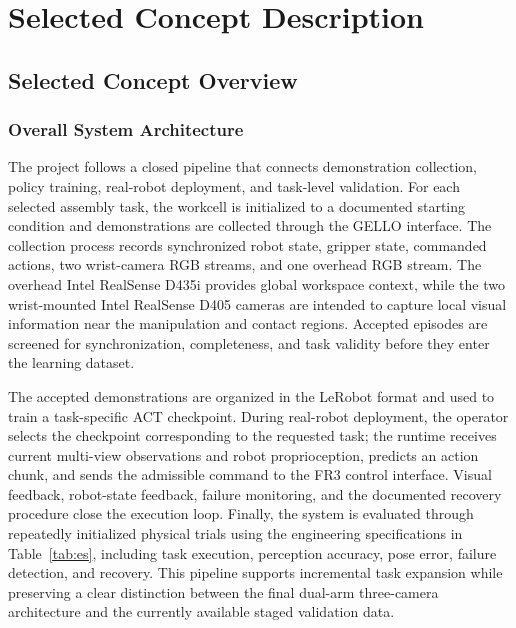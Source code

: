 \documentclass[12pt, letterpaper]{article}
\begin{document}
\section{Selected Concept Description}

\subsection{Selected Concept Overview}

\subsubsection{Overall System Architecture}

The project follows a closed pipeline that connects demonstration collection, policy training, real-robot deployment,
  and task-level validation. For each selected assembly task, the workcell is initialized to a documented starting
  condition and demonstrations are collected through the GELLO interface. The collection process records synchronized
  robot state, gripper state, commanded actions, two wrist-camera RGB streams, and one overhead RGB stream. The overhead
  Intel RealSense D435i provides global workspace context, while the two wrist-mounted Intel RealSense D405 cameras are
  intended to capture local visual information near the manipulation and contact regions. Accepted episodes are screened
  for synchronization, completeness, and task validity before they enter the learning dataset.

  The accepted demonstrations are organized in the LeRobot format and used to train a task-specific ACT checkpoint.
  During real-robot deployment, the operator selects the checkpoint corresponding to the requested task; the runtime
  receives current multi-view observations and robot proprioception, predicts an action chunk, and sends the admissible
  command to the FR3 control interface. Visual feedback, robot-state feedback, failure monitoring, and the documented
  recovery procedure close the execution loop. Finally, the system is evaluated through repeatedly initialized physical
  trials using the engineering specifications in Table~\ref{tab:es}, including task execution, perception accuracy, pose
  error, failure detection, and recovery. This pipeline supports incremental task expansion while preserving a clear
  distinction between the final dual-arm three-camera architecture and the currently available staged validation data.
\end{document}
